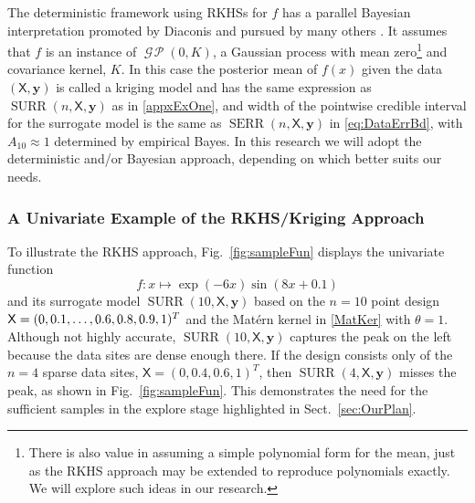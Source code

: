 \documentclass[11pt]{NSFamsart}
\DeclareMathOperator{\GP}{\mathcal{G} \! \mathcal{P}}
\DeclareMathOperator{\SURR}{SURR}
\DeclareMathOperator{\SURRERR}{SERR}
\newcommand{\mX}{\mathsf{X}}
\newcommand{\by}{{\boldsymbol{y}}}
\begin{document}
The deterministic framework using RKHSs for $f$ has a parallel Bayesian interpretation promoted by Diaconis \cite{Dia88a} and pursued by many others \cite{BriEtal18a, OHa91a, OwhEtal19a, RasWil06a, Rit00a}.  It assumes that $f$ is an instance of $\GP(0,K)$, a Gaussian process with mean zero\footnote{There is also value in assuming a simple polynomial form for the mean, just as the RKHS approach may be extended to reproduce polynomials exactly. We will explore such ideas in our research.} and covariance kernel, $K$.  In this case the posterior mean of $f(x)$ given the data $(\mX,\by)$ is called a kriging model and has the same expression as $\SURR(n,\mX,\by)$ as in \eqref{appxExOne}, and width of the pointwise credible interval for the surrogate model is the same as $\SURRERR(n,\mX,\by)$ in \eqref{eq:DataErrBd}, with $A_{10} \approx 1$ determined by empirical Bayes.  In this research we will adopt the deterministic and/or Bayesian approach, depending on which better suits our needs.

\subsubsection{A Univariate Example of the RKHS/Kriging Approach} \label{sec:UnivarEx}

To illustrate the RKHS approach, Fig.\ \ref{fig:sampleFun} displays the univariate function
\begin{equation} \label{eq:univarfun}
f \colon x \mapsto \exp(-6x) \sin(8x+0.1)
\end{equation}
and its surrogate model $\SURR(10,\mX,\by)$ based on the $n=10$ point design $\mX = (0, 0.1, \ldots, 0.6, 0.8,\linebreak 0.9, 1)^T$ and the Mat\'ern kernel in \eqref{MatKer} with $\theta =1$.  
Although not highly accurate, $\SURR(10,\mX,\by)$ captures the peak on the left because the data sites are dense enough there.  If the design consists only of the $n=4$ sparse data sites, $\mX = (0, 0.4,  0.6, 1)^T$, then $\SURR(4,\mX,\by)$ misses the peak, as shown in Fig.\ \ref{fig:sampleFun}. This demonstrates the need for the sufficient samples in the explore stage highlighted in Sect.\ \ref{sec:OurPlan}. 
\end{document}
